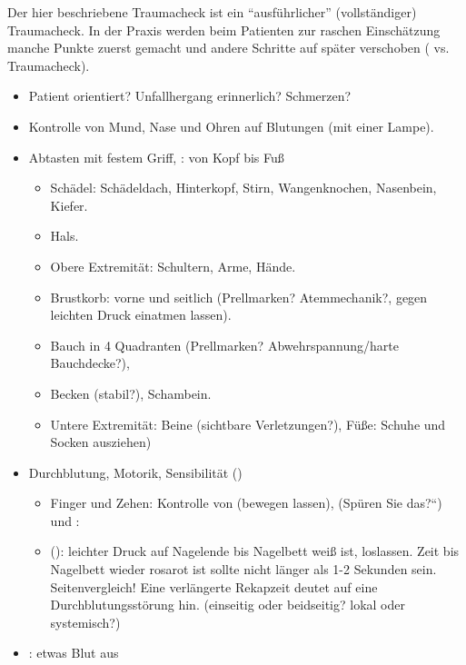 {
Der
hier beschriebene Traumacheck ist ein "`ausführlicher"' (vollständiger)
Traumacheck. In der Praxis werden beim Patienten zur raschen Einschätzung manche Punkte zuerst
gemacht und andere Schritte auf später verschoben ( vs.
 Traumacheck).

\begin{itemize}
  \item Patient orientiert? Unfallhergang erinnerlich? Schmerzen?
  \item Kontrolle von Mund, Nase und Ohren auf Blutungen (mit einer
  Lampe).
  \item Abtasten mit festem Griff, : von Kopf bis Fuß
  \begin{itemize}
    \item Schädel: Schädeldach, Hinterkopf,
    Stirn, Wangenknochen, Nasenbein, Kiefer.
    \item Hals.
    \item Obere Extremität: Schultern, Arme, Hände.
    \item Brustkorb: vorne und seitlich (Prellmarken? Atemmechanik?, gegen leichten
    Druck einatmen lassen).
    \item Bauch in 4 Quadranten (Prellmarken?
    Abwehrspannung/harte Bauchdecke?),
    \item Becken (stabil?), Schambein.
    \item Untere Extremität: Beine (sichtbare Verletzungen?), Füße:
    Schuhe und Socken ausziehen)
  \end{itemize}
  \item Durchblutung, Motorik, Sensibilität ()
  \begin{itemize}
    \item Finger und Zehen: Kontrolle von  (bewegen lassen),  ({\quotedblbase}Spüren
    Sie das?{\textquotedblleft}) und :
    \item {} (): leichter Druck auf
    Nagelende bis Nagelbett weiß ist, loslassen. Zeit bis Nagelbett wieder
    rosarot ist sollte nicht länger als 1-2 Sekunden sein.
    Seitenvergleich! Eine verlängerte Rekapzeit deutet auf eine
    Durchblutungsstörung hin. (einseitig oder beidseitig? lokal oder systemisch?)
  \end{itemize}
  \item {}\label{topic:tupfertest}: etwas Blut aus

\end{itemize}}
